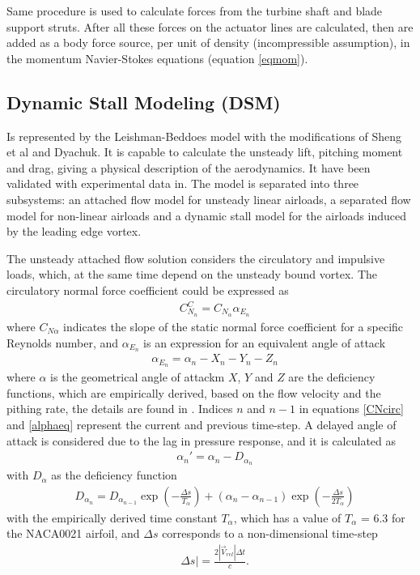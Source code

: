\documentclass[a4paper]{jpconf}
\begin{document}
Same procedure is used to calculate forces from the turbine shaft and blade support struts. After all these forces on the actuator lines are calculated, then are added as a body force source, per unit of density (incompressible assumption), in the momentum Navier-Stokes equations (equation \ref{eqmom}). 
 
\subsection{Dynamic Stall Modeling (DSM)} Is represented by the Leishman-Beddoes
model\cite{leishman1986generalised} with the modifications of Sheng et
al\cite{sheng2008modified} and Dyachuk\cite{dyachuk}.
It is capable to calculate the unsteady lift,
pitching moment and drag, giving a physical description of the aerodynamics. It
have been validated with experimental data in\cite{leishman1989semi}.
The model is separated into three subsystems: an attached flow model for unsteady linear
airloads, a separated flow model for non-linear airloads and a dynamic stall
model for the airloads induced by the leading edge vortex.

The unsteady attached flow solution considers the circulatory and impulsive loads, which, at the same time depend on the unsteady bound vortex. The circulatory normal force coefficient could be expressed as
\begin{align}
& C_{N_n}^C = C_{N_\alpha} \alpha_{E_n}	\label{CNcirc}
\end{align}
where $C_{N \alpha}$ indicates the slope of the static normal force coefficient for a specific Reynolds number, and $\alpha_{E_n}$ is an expression for an equivalent angle of attack
\begin{align}
& \alpha_{E_n} = \alpha_n - X_n -Y_n - Z_n	\label{alphaeq}
\end{align}
where $\alpha$ is the geometrical angle of attackm $X$, $Y$ and $Z$ are the deficiency functions, which are empirically derived, based on the flow velocity and the pithing rate, the details are found in \cite{dyachuk2013dynamic}. Indices $n$ and $n-1$ in equations \ref{CNcirc} and \ref{alphaeq} represent the current and previous time-step. A delayed angle of attack is considered due to the lag in pressure response, and it is calculated as
\begin{align}
& {\alpha _n}' = {\alpha _n} - D_{\alpha _n}    	\label{alphadel}
\end{align}
with $D_\alpha$ as the deficiency function
\begin{align}
& D_{\alpha_n} = D_{\alpha_{n-1}} \exp \left( - \frac{\Delta s}{T_\alpha} \right) + (\alpha_n - \alpha_{n-1})\exp \left( - \frac{\Delta s}{2T_\alpha} \right) \label{defalpha}
\end{align}
with the empirically derived time constant $T_\alpha$, which has a value of $T_\alpha$ = 6.3 for the NACA0021 airfoil, and $\Delta s$ corresponds to a non-dimensional time-step
\begin{align}
& \Delta s| = \frac{2 | \vec{V}_{rel} | \Delta t}{c}		.	\label{deltas}
\end{align}
\end{document}
